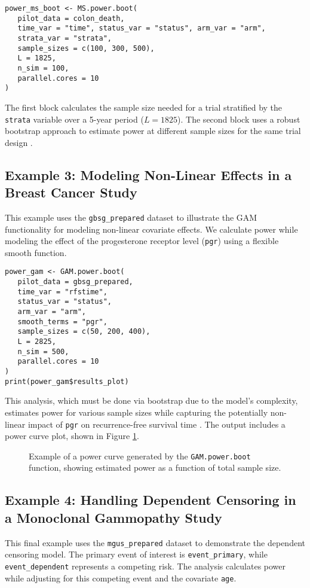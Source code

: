 \documentclass[article]{jss}
\begin{document}
\begin{lstlisting}
power_ms_boot <- MS.power.boot(
   pilot_data = colon_death,
   time_var = "time", status_var = "status", arm_var = "arm",
   strata_var = "strata",
   sample_sizes = c(100, 300, 500),
   L = 1825,
   n_sim = 100, 
   parallel.cores = 10 
)
\end{lstlisting}
The first block calculates the sample size needed for a trial stratified by the \texttt{strata} variable over a 5-year period ($L=1825$). The second block uses a robust bootstrap approach to estimate power at different sample sizes for the same trial design \cite{[1]}.

\subsection{Example 3: Modeling Non-Linear Effects in a Breast Cancer Study}
This example uses the \texttt{gbsg\_prepared} dataset to illustrate the GAM functionality for modeling non-linear covariate effects. We calculate power while modeling the effect of the progesterone receptor level (\texttt{pgr}) using a flexible smooth function.

\begin{lstlisting}
power_gam <- GAM.power.boot(
   pilot_data = gbsg_prepared,
   time_var = "rfstime",
   status_var = "status",
   arm_var = "arm",
   smooth_terms = "pgr",
   sample_sizes = c(50, 200, 400),
   L = 2825,
   n_sim = 500,
   parallel.cores = 10
)
print(power_gam$results_plot)
\end{lstlisting}
This analysis, which must be done via bootstrap due to the model's complexity, estimates power for various sample sizes while capturing the potentially non-linear impact of \texttt{pgr} on recurrence-free survival time \cite{[1]}. The output includes a power curve plot, shown in Figure \ref{fig:gam_plot}.

\begin{figure}[h!]
    \centering
    \caption{Example of a power curve generated by the \texttt{GAM.power.boot} function, showing estimated power as a function of total sample size.}
    \label{fig:gam_plot}
\end{figure}

\subsection{Example 4: Handling Dependent Censoring in a Monoclonal Gammopathy Study}
This final example uses the \texttt{mgus\_prepared} dataset to demonstrate the dependent censoring model. The primary event of interest is \texttt{event\_primary}, while \texttt{event\_dependent} represents a competing risk. The analysis calculates power while adjusting for this competing event and the covariate \texttt{age}.
\end{document}
